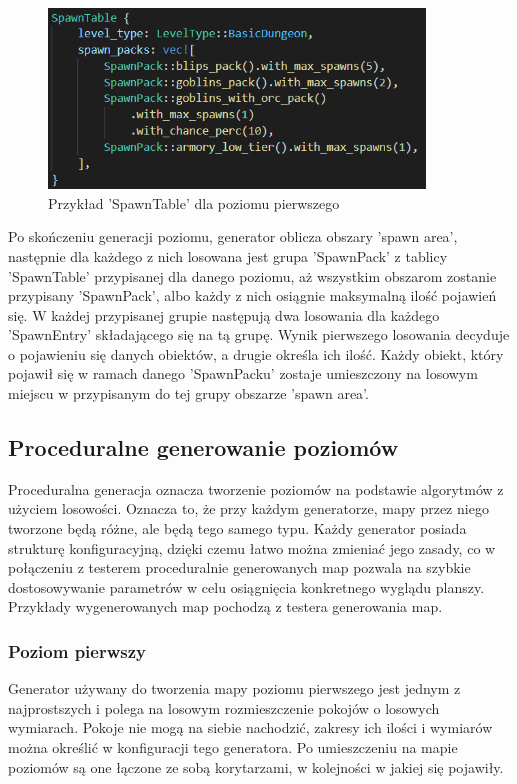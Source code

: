 \documentclass[12pt,twoside]{article}
\begin{document}
\FloatBarrier
\begin{figure}[h]
	\centering
	\includegraphics[width=10cm]{images/code/basic_spawn.png}
	\caption{Przykład 'SpawnTable' dla poziomu pierwszego}
	\label{code:basic_spawn}
\end{figure}
\FloatBarrier

Po skończeniu generacji poziomu, generator oblicza obszary 'spawn area', następnie dla każdego z nich losowana jest grupa 'SpawnPack' z tablicy 'SpawnTable' przypisanej dla danego poziomu, aż wszystkim obszarom zostanie przypisany 'SpawnPack', albo każdy z nich osiągnie maksymalną ilość pojawień się. W każdej przypisanej grupie następują dwa losowania dla każdego 'SpawnEntry' składającego się na tą grupę. Wynik pierwszego losowania decyduje o pojawieniu się danych obiektów, a drugie określa ich ilość. Każdy obiekt, który pojawił się w ramach danego 'SpawnPacku' zostaje umieszczony na losowym miejscu w przypisanym do tej grupy obszarze 'spawn area'.


\subsection{Proceduralne generowanie poziomów}
Proceduralna generacja oznacza tworzenie poziomów na podstawie algorytmów z użyciem losowości. Oznacza to, że przy każdym generatorze, mapy przez niego tworzone będą różne, ale będą tego samego typu. Każdy generator posiada strukturę konfiguracyjną, dzięki czemu łatwo można zmieniać jego zasady, co w połączeniu z testerem proceduralnie generowanych map pozwala na szybkie dostosowywanie parametrów w celu osiągnięcia konkretnego wyglądu planszy. Przykłady wygenerowanych map pochodzą z testera generowania map.

\subsubsection{Poziom pierwszy}
Generator używany do tworzenia mapy poziomu pierwszego jest jednym z najprostszych i polega na losowym rozmieszczenie pokojów o losowych wymiarach. Pokoje nie mogą na siebie nachodzić, zakresy ich ilości i wymiarów można określić w konfiguracji tego generatora. Po umieszczeniu na mapie poziomów są one łączone ze sobą korytarzami, w kolejności w jakiej się pojawiły.
\end{document}
